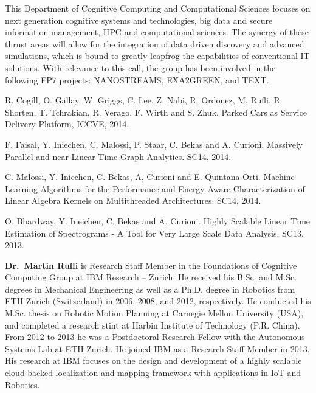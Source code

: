 This Department of Cognitive Computing and Computational Sciences focuses on next generation cognitive systems and technologies, big data and secure information management, HPC and computational sciences. The synergy of these thrust areas will allow for the integration of data driven discovery and advanced simulations, which is bound to greatly leapfrog the capabilities of conventional IT solutions. With relevance to this call, the group has been involved in the following FP7 projects: NANOSTREAMS, EXA2GREEN, and TEXT.

\begin{keypubs}{\IBM}
  \item R. Cogill, O. Gallay, W. Griggs, C. Lee, Z. Nabi, R. Ordonez, M. Rufli, R. Shorten, T. Tchrakian, R. Verago, F. Wirth and S. Zhuk. Parked Cars as Service Delivery Platform, ICCVE, 2014.
  \item F. Faisal, Y. Iniechen, C. Malossi, P. Staar, C. Bekas and A. Curioni. Massively Parallel and near Linear Time Graph Analytics. SC14, 2014.
  \item C. Malossi, Y. Iniechen,  C. Bekas, A,  Curioni and E. Quintana-Orti. Machine Learning Algorithms for the Performance and Energy-Aware Characterization of Linear Algebra Kernels on Multithreaded Architectures. SC14, 2014.
  \item O. Bhardway, Y. Ineichen, C. Bekas and A. Curioni. Highly Scalable Linear Time Estimation of Spectrograms - A Tool for Very Large Scale Data Analysis. SC13, 2013.
\end{keypubs}


{\bf Dr.~Martin Rufli} is Research Staff Member in the Foundations of Cognitive Computing Group at IBM Research -- Zurich. He received his B.Sc. and M.Sc. degrees in Mechanical Engineering as well as a Ph.D. degree in Robotics from ETH Zurich (Switzerland) in 2006, 2008, and 2012, respectively. He conducted his M.Sc. thesis on Robotic Motion Planning at Carnegie Mellon University (USA), and completed a research stint at Harbin Institute of Technology (P.R. China). From 2012 to 2013 he was a Postdoctoral Research Fellow with the Autonomous Systems Lab at ETH Zurich. He joined IBM as a Research Staff Member in 2013. His research at IBM focuses on the design and  development of a highly scalable cloud-backed localization and mapping framework with applications in IoT and Robotics.


